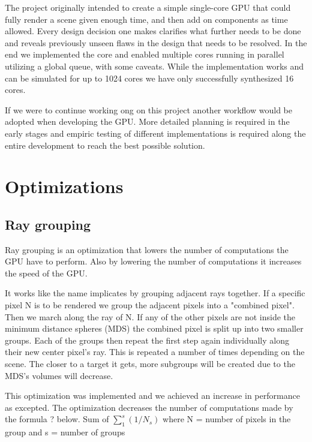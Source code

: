 			The project originally intended to create a simple single-core GPU
			that could fully render a scene given enough time, and then add on
			components as time allowed.
			Every design decision one makes clarifies what further needs to be
			done and reveals previously unseen flaws in the design that needs
			to be resolved. In the end we implemented the core and enabled
			multiple cores running in parallel utilizing a global queue, with
			some caveats. While the implementation works and can be simulated
			for up to 1024 cores we have only successfully synthesized 16 cores. 
			
			If we were to continue working ong on this project another workflow
			would be adopted when developing the GPU. More detailed planning is 
			required in the early stages and empiric testing of different 
			implementations is required along the entire development to reach
			the best possible solution.

	\section{Optimizations}

		\subsection{Ray grouping}
		
			Ray grouping is an optimization that lowers the number of
			computations the GPU have to perform. Also by lowering the number of
			computations it increases the speed of the GPU.
			
			It works like the name implicates by grouping adjacent rays
			together. If a specific pixel N is to be rendered we group the
			adjacent pixels into a "combined pixel". Then we march along the
			ray of N. If any of the other pixels are not inside the minimum
			distance spheres (MDS) the combined pixel is split up into two
			smaller groups. Each of the groups then repeat the first step again
			individually along their new center pixel's ray. This is repeated a
			number of times depending on the scene.  The closer to a target it
			gets, more subgroups will be created due to the MDS's volumes will
			decrease.
			
			This optimization was implemented and we achieved an increase in
			performance as excepted. The optimization decreases the number of
			computations made by the formula ? below.  Sum of $\sum_1^s(1/N_s)$
			where N = number of pixels in the group and s = number of groups

